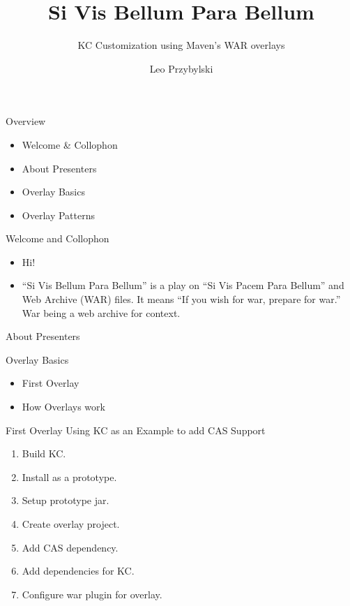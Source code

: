 \documentclass[xcolor=dvipsnames,14pt]{beamer}
\begin{document}
\title{Si Vis Bellum Para Bellum}
\subtitle{KC Customization using Maven's WAR overlays}
\author[Leo]{Leo Przybylski}


\begin{frame}[plain]
  \titlepage
\end{frame}

\begin{frame}{Overview}
  \begin{itemize}
  \item Welcome \& Collophon
  \item About Presenters
  \item Overlay Basics
  \item Overlay Patterns
  \end{itemize}
\end{frame}

\begin{frame}{Welcome and Collophon}
  \begin{itemize}
    \item Hi!
    \item ``Si Vis Bellum Para Bellum'' is a play on ``Si Vis Pacem
      Para Bellum'' and Web Archive (WAR) files. It means ``If you
      wish for war, prepare for war.'' War being a web archive for context.
  \end{itemize}
\end{frame}

\begin{frame}{About Presenters}
\end{frame}

\begin{frame}{Overlay Basics}
  \begin{itemize}
  \item First Overlay
  \item How Overlays work
  \end{itemize}
\end{frame}

\begin{frame}{First Overlay}
  Using KC as an Example to add CAS Support
  \begin{enumerate}
    \item Build KC.
    \item Install as a prototype.
    \item Setup prototype jar.
    \item Create overlay project.
    \item Add CAS dependency.
    \item Add dependencies for KC.
    \item Configure war plugin for overlay.
  \end{enumerate}
\end{frame}
\end{document}
